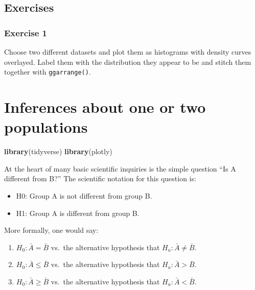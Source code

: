 \documentclass[english,10pt,a4paper,oneside]{book}
\providecommand{\tightlist}{%
  \setlength{\itemsep}{0pt}\setlength{\parskip}{0pt}}
\newenvironment{Shaded}{\begin{snugshade}}{\end{snugshade}}
\newcommand{\KeywordTok}[1]{\textcolor[rgb]{0.13,0.29,0.53}{\textbf{#1}}}
\newcommand{\NormalTok}[1]{#1}
\theoremstyle{definition}
\theoremstyle{definition}
\theoremstyle{definition}
\theoremstyle{remark}
\begin{document}
\hypertarget{exercises-2}{%
\section{Exercises}\label{exercises-2}}

\hypertarget{exercise-1-2}{%
\subsection{Exercise 1}\label{exercise-1-2}}

Choose two different datasets and plot them as histograms with density
curves overlayed. Label them with the distribution they appear to be and
stitch them together with \texttt{ggarrange()}.

\hypertarget{inferences-about-one-or-two-populations}{%
\chapter{Inferences about one or two
populations}\label{inferences-about-one-or-two-populations}}

\begin{Shaded}
\begin{Highlighting}[]
\KeywordTok{library}\NormalTok{(tidyverse)}
\KeywordTok{library}\NormalTok{(plotly)}
\end{Highlighting}
\end{Shaded}

At the heart of many basic scientific inquiries is the simple question
\enquote{Is A different from B?} The scientific notation for this
question is:

\begin{itemize}
\tightlist
\item
  H0: Group A is not different from group B.
\item
  H1: Group A is different from group B.
\end{itemize}

More formally, one would say:

\begin{enumerate}
\def\labelenumi{\arabic{enumi}.}
\tightlist
\item
  \(H_{0}: \bar{A} = \bar{B}\) vs.~the alternative hypothesis that
  \(H_{a}: \bar{A} \neq \bar{B}\).
\item
  \(H_{0}: \bar{A} \leq \bar{B}\) vs.~the alternative hypothesis that
  \(H_{a}: \bar{A} > \bar{B}\).
\item
  \(H_{0}: \bar{A} \geq \bar{B}\) vs.~the alternative hypothesis that
  \(H_{a}: \bar{A} < \bar{B}\).
\end{enumerate}
\end{document}
